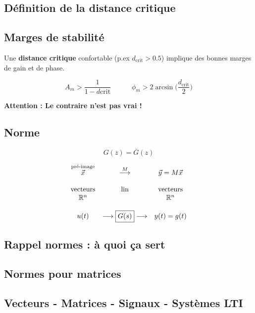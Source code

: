 \documentclass[document.tex]{subfiles}
\begin{document}

\subsection{Définition de la distance critique}


\subsection{Marges de stabilité}

Une \textbf{distance critique} confortable (p.ex $d_{\text{crit}}>0.5$) implique des 
bonnes marges de gain et de phase.


$$
\boxed{ A_m > \dfrac{1}{1-d{\text{crit}}}} \quad \quad \quad \boxed{\phi_m > 2 \arcsin\bigg( \dfrac{d_{\text{crit}}}{2} \bigg)}
$$

\textbf{Attention : Le contraire n'est pas vrai !}\\


\subsection{Norme}

$$ \boxed{G(\overline{z}) = \overline{G}(z)} $$

$$ \begin{array}{c c c}
\overset{\text{pré-image}}{\vec{x}} & \overset{M}{\longrightarrow} & \vec{y}= M\vec{x}\\[12pt]
\text{vecteurs} & \text{lin} & \text{vecteurs} \\
\mathbb{R}^n & & \mathbb{R}^n  \\[12pt]
u(t)&\longrightarrow \boxed{G(s)} \longrightarrow  & y(t) = g(t)
\end{array} $$
\subsection{Rappel normes : à quoi ça sert}

\subsection{Normes pour matrices}

\subsection{Vecteurs - Matrices - Signaux - Systèmes LTI}
\end{document}
